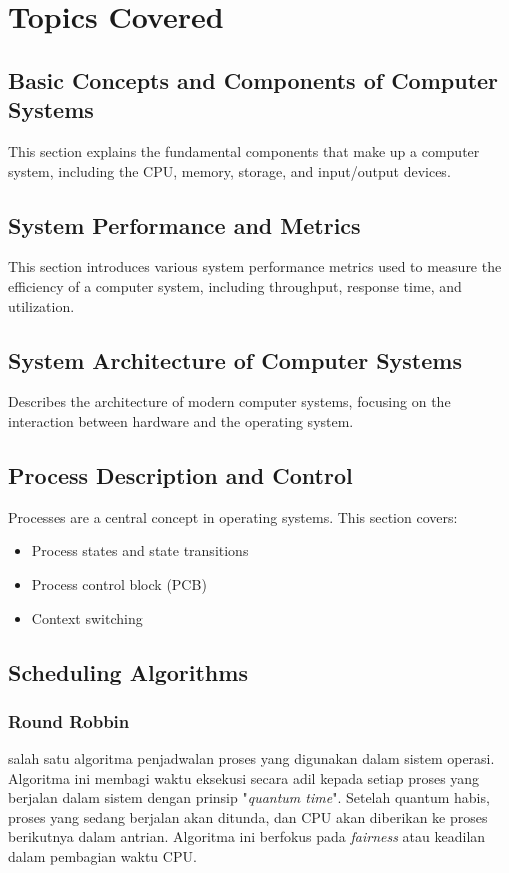 \documentclass[12pt]{article}
\begin{document}
\section{Topics Covered}

\subsection{Basic Concepts and Components of Computer Systems}
This section explains the fundamental components that make up a computer system, including the CPU, memory, storage, and input/output devices.

\subsection{System Performance and Metrics}
This section introduces various system performance metrics used to measure the efficiency of a computer system, including throughput, response time, and utilization.

\subsection{System Architecture of Computer Systems}
Describes the architecture of modern computer systems, focusing on the interaction between hardware and the operating system.

\subsection{Process Description and Control}
Processes are a central concept in operating systems. This section covers:
\begin{itemize}
    \item Process states and state transitions
    \item Process control block (PCB)
    \item Context switching
\end{itemize}

\subsection{Scheduling Algorithms}
\subsubsection{Round Robbin}
salah satu algoritma penjadwalan proses yang digunakan dalam sistem operasi. Algoritma ini membagi waktu eksekusi secara adil kepada setiap proses yang berjalan dalam sistem dengan prinsip "\textit{quantum time}". Setelah quantum habis, proses yang sedang berjalan akan ditunda, dan CPU akan diberikan ke proses berikutnya dalam antrian. Algoritma ini berfokus pada \textit{fairness} atau keadilan dalam pembagian waktu CPU.
\end{document}
